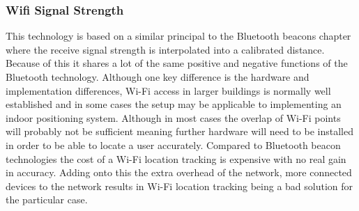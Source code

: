 \subsubsection{Wifi Signal Strength}
This technology is based on a similar principal to the Bluetooth beacons chapter where the receive signal strength is interpolated into a calibrated distance. Because of this it shares a lot of the same positive and negative functions of the Bluetooth technology. Although one key difference is the hardware and implementation differences, Wi-Fi access in larger buildings is normally well established and in some cases the setup may be applicable to implementing an indoor positioning system. Although in most cases the overlap of Wi-Fi points will probably not be sufficient meaning further hardware will need to be installed in order to be able to locate a user accurately. Compared to Bluetooth beacon technologies the cost of a Wi-Fi location tracking is expensive with no real gain in accuracy. Adding onto this the extra overhead of the network, more connected devices to the network results in Wi-Fi location tracking being a bad solution for the particular case.